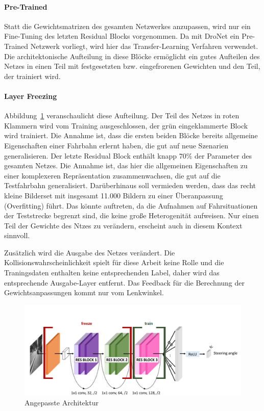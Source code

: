 \paragraph{Pre-Trained}
Statt die Gewichtsmatrizen des gesamten Netzwerkes anzupassen, wird nur ein Fine-Tuning des letzten Residual Blocks vorgenommen. Da mit DroNet ein Pre-Trained Netzwerk vorliegt, wird hier das Transfer-Learning \cite{pan2010survey} Verfahren verwendet. Die architektonische Aufteilung in diese Blöcke ermöglicht ein gutes Aufteilen des Netzes in einen Teil mit festgesetzten bzw. eingefrorenen Gewichten und den Teil, der trainiert wird.

\paragraph{Layer Freezing}
Abbildung~\ref{img:dronetfrozen} veranschaulicht diese Aufteilung. Der Teil des Netzes in roten Klammern wird vom Training ausgeschlossen, der grün eingeklammerte Block wird trainiert. Die Annahme ist, dass die ersten beiden Blöcke bereits allgemeine Eigenschaften einer Fahrbahn erlernt haben, die gut auf neue Szenarien generalisieren. Der letzte Residual Block enthält knapp $70\%$ der Parameter des gesamten Netzes. Die Annahme ist, das hier die allgemeinen Eigenschaften zu einer komplexeren Repräsentation zusammenwachsen, die gut auf die Testfahrbahn generalisiert. Darüberhinaus soll vermieden werden, dass das recht kleine Bilderset mit insgesamt 11.000 Bildern zu einer Überanpassung (Overfitting) führt. Das könnte auftreten, da die Aufnahmen auf Fahrsituationen der Teststrecke begrenzt sind, die keine große Heterogenität aufweisen. Nur einen Teil der Gewichte des Ntzes zu verändern, erscheint auch in diesem Kontext sinnvoll.

Zusätzlich wird die Ausgabe des Netzes verändert. Die Kollisionswahrscheinlichkeit spielt für diese Arbeit keine Rolle und die Traningsdaten enthalten keine entsprechenden Label, daher wird das entsprechende Ausgabe-Layer entfernt. Das Feedback für die Berechnung der Gewichtsanpassungen kommt nur vom Lenkwinkel.

\begin{figure}[h]
	\centering
	\includegraphics[scale=0.5]{figures/Architecture-DRONET-FROZEN.png}
	\caption{Angepasste Architektur}
	\label{img:dronetfrozen}
\end{figure}

